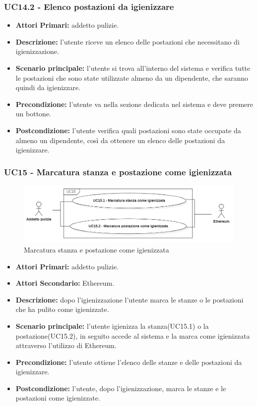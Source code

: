 \subsubsection{UC14.2 - Elenco postazioni da igienizzare}
\begin{itemize}
           	\item\textbf{Attori Primari:} addetto pulizie.
           	\item\textbf{Descrizione:} l'utente riceve un elenco delle postazioni che necessitano di igienizzazione.
           	\item\textbf{Scenario principale:} l'utente si trova all'interno del sistema e verifica tutte le postazioni che sono state utilizzate almeno da un dipendente, che saranno quindi da igienizzare.
           	\item\textbf{Precondizione:} l'utente va nella sezione dedicata nel sistema e deve premere un bottone.
           	\item\textbf{Postcondizione:} l'utente verifica quali postazioni sono state occupate da almeno un dipendente, così da ottenere un elenco delle postazioni da igienizzare.
\end{itemize}

\subsubsection{ UC15 - Marcatura stanza e postazione come igienizzata}
\begin{figure}[H]
		\centering
		\includegraphics[width=18cm]{res/images/UC15.png}
		\caption{Marcatura stanza e postazione come igienizzata}
		\label{fig:Marcatura stanza e postazione come igienizzata}
	\end{figure}
\begin{itemize}
           	\item\textbf{Attori Primari:} addetto pulizie.
		\item\textbf{Attori Secondario:} Ethereum.
           	\item\textbf{Descrizione:} dopo l'igienizzazione l'utente marca le stanze o le postazioni che ha pulito come igienizzate.
           	\item\textbf{Scenario principale:} l'utente igienizza la stanza(UC15.1) o la postazione(UC15.2), in seguito accede al sistema e la marca come igienizzata attraverso l'utilizzo di Ethereum.
           	\item\textbf{Precondizione:} l'utente ottiene l'elenco delle stanze e delle postazioni da igienizzare.
           	\item\textbf{Postcondizione:} l'utente, dopo l'igienizzazione, marca le stanze e le postazioni come igienizzate.
\end{itemize}
